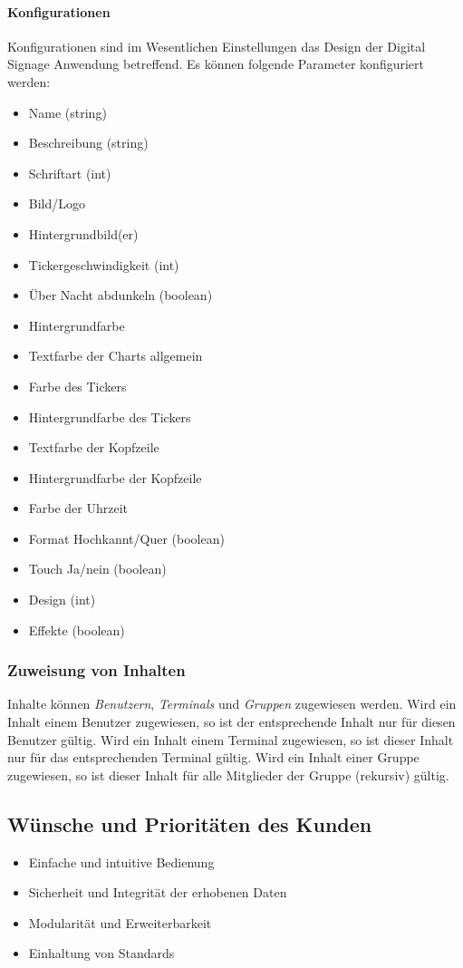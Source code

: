 \documentclass[a4paper]{article}
\begin{document}
	\paragraph{Konfigurationen}
	Konfigurationen sind im Wesentlichen Einstellungen das Design der Digital Signage Anwendung betreffend.
	Es können folgende Parameter konfiguriert werden:
	\begin{itemize}
	\item Name (string)
	\item Beschreibung (string)
	\item Schriftart (int)
	\item Bild/Logo
	\item Hintergrundbild(er)
	\item Tickergeschwindigkeit (int)
	\item Über Nacht abdunkeln (boolean)
	\item Hintergrundfarbe
	\item Textfarbe der Charts allgemein
	\item Farbe des Tickers
	\item Hintergrundfarbe des Tickers
	\item Textfarbe der Kopfzeile
	\item Hintergrundfarbe der Kopfzeile
	\item Farbe der Uhrzeit
	\item Format Hochkannt/Quer (boolean)
	\item Touch Ja/nein (boolean)
	\item Design (int)
	\item Effekte (boolean)
	\end{itemize}
	\subsubsection{Zuweisung von Inhalten}
	Inhalte können \emph{Benutzern}, \emph{Terminals} und \emph{Gruppen} zugewiesen werden.
	Wird ein Inhalt einem Benutzer zugewiesen, so ist der entsprechende Inhalt nur für diesen Benutzer gültig. Wird ein Inhalt einem Terminal zugewiesen, so ist dieser Inhalt nur für das entsprechenden Terminal gültig. Wird ein Inhalt einer Gruppe zugewiesen, so ist dieser Inhalt für alle Mitglieder der Gruppe (rekursiv) gültig.
	\subsection{Wünsche und Prioritäten des Kunden}
	\begin{itemize}
		\item Einfache und intuitive Bedienung
		\item Sicherheit und Integrität der erhobenen Daten
		\item Modularität und Erweiterbarkeit
		\item Einhaltung von Standards
	\end{itemize}
		
\end{document}
